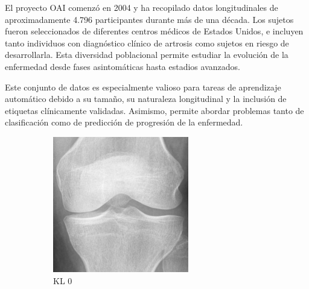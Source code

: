 \documentclass[11pt,spanish,listoffigures,listoftables]{tfgetsinf}
\begin{document}
El proyecto OAI comenzó en 2004 y ha recopilado datos longitudinales de aproximadamente 4.796 participantes durante más de una 
década. Los sujetos fueron seleccionados de diferentes centros médicos de Estados Unidos, e incluyen tanto individuos con 
diagnóstico clínico de artrosis como sujetos en riesgo de desarrollarla. Esta diversidad poblacional permite estudiar la 
evolución de la enfermedad desde fases asintomáticas hasta estadios avanzados.

Este conjunto de datos es especialmente valioso para tareas de aprendizaje automático debido a su tamaño, su naturaleza longitudinal y la inclusión de etiquetas clínicamente validadas. Asimismo, permite abordar problemas tanto de clasificación como de predicción de progresión de la enfermedad.

\begin{figure}[htbp]
    \centering
    \begin{subfigure}[b]{0.19\textwidth}
        \includegraphics[width=\textwidth]{knee_0.png}
        \caption{KL 0}
        \label{fig:knee0}
    \end{subfigure}
    \hfill
    \begin{subfigure}[b]{0.19\textwidth}

\end{subfigure}
\end{figure}
\end{document}
